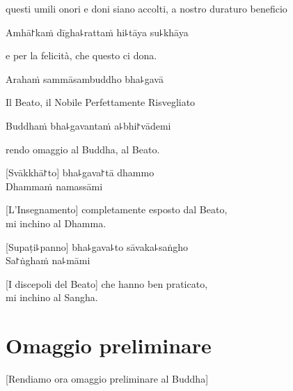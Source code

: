 \begin{english}
questi umili onori e doni siano accolti, a nostro duraturo beneficio
\end{english}


Amhā꜓kaṁ dīgha꜕rattaṁ hi꜕tāya su꜕khāya\\

\begin{english}
e per la felicità, che questo ci dona.
\end{english}

\clearpage

Arahaṁ sammāsambuddho bha꜕gavā\\

\begin{english}
Il Beato, il Nobile Perfettamente Risvegliato
\end{english}


Buddhaṁ bha꜕gavantaṁ a꜕bhi꜓vādemi 

\begin{english}
rendo omaggio al Buddha, al Beato. 
\end{english}



[Svākkhā꜓to] bha꜕gava꜓tā dhammo\\
Dhammaṁ namassāmi 

\begin{english}
[L'Insegnamento] completamente esposto dal Beato,\\
mi inchino al Dhamma.
\end{english}


[Supaṭi꜕panno] bha꜕gava꜕to sāvaka꜕saṅgho\\
Sa꜓ṅghaṁ na꜕māmi 

\begin{english}
 [I discepoli del Beato] che hanno ben praticato,\\
mi inchino al Sangha.
\end{english}

\clearpage


\chapter*{Omaggio preliminare}

\begin{leader}
\end{leader}

\begin{english}
[Rendiamo ora omaggio preliminare al Buddha]
\end{english}

